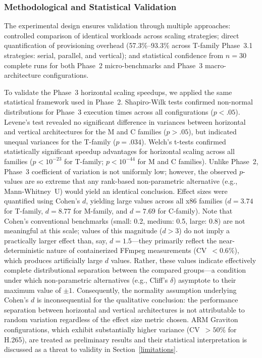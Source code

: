 \documentclass[conference]{IEEEtran}
\begin{document}
\subsubsection{Methodological and Statistical Validation}

The experimental design ensures validation through multiple approaches:
controlled comparison of identical workloads across scaling strategies; direct
quantification of provisioning overhead (57.3\%--93.3\% across T-family Phase~3.1 strategies: serial, parallel, and vertical); and statistical confidence from $n=30$ complete runs
for both Phase~2 micro-benchmarks and Phase~3 macro-architecture configurations.

To validate the Phase~3 horizontal scaling speedups, we applied the same
statistical framework used in Phase~2. Shapiro-Wilk tests confirmed non-normal
distributions for Phase~3 execution times across all configurations ($p <
.05$). Levene's test revealed no significant difference in variances between
horizontal and vertical architectures for the M and C families ($p > .05$), but
indicated unequal variances for the T-family ($p = .034$). Welch's t-tests
confirmed statistically significant speedup advantages for horizontal scaling
across all families ($p < 10^{-23}$ for T-family; $p < 10^{-44}$ for M and C
families). Unlike Phase~2, Phase~3 coefficient of variation is not uniformly
low; however, the observed $p$-values are so extreme that any rank-based
non-parametric alternative (e.g., Mann-Whitney~U) would yield an identical
conclusion. Effect sizes were quantified using Cohen's $d$, yielding large
values across all x86 families ($d = 3.74$ for T-family, $d = 8.77$ for
M-family, and $d = 7.69$ for C-family). Note that Cohen's conventional benchmarks (small: 0.2, medium: 0.5, large: 0.8) are not meaningful at this scale; values of this magnitude ($d > 3$) do not imply a practically larger effect than, say, $d = 1.5$---they primarily reflect the near-deterministic nature of containerized FFmpeg measurements (CV~$< 0.6\%$), which produces artificially large $d$ values. Rather, these values
indicate effectively complete distributional separation between the compared
groups---a condition under which non-parametric alternatives (e.g., Cliff's
$\delta$) asymptote to their maximum value of $\pm 1$. Consequently, the
normality assumption underlying Cohen's $d$ is inconsequential for the
qualitative conclusion: the performance separation between horizontal and
vertical architectures is not attributable to random variation regardless of
the effect size metric chosen. ARM Graviton configurations, which exhibit substantially
higher variance (CV~$>50\%$ for H.265), are treated as preliminary results
and their statistical interpretation is discussed as a threat to validity in
Section~\ref{limitations}.
\end{document}
